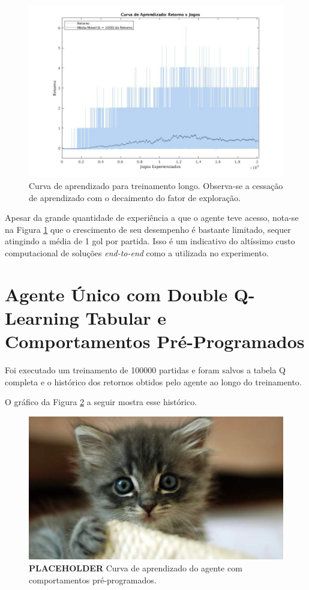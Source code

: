 \begin{figure}[h]
	\includegraphics[width=0.8\linewidth]{figs/curvalonga-qtabular.jpg}
	\centering
	\caption{Curva de aprendizado para treinamento longo. Observa-se a cessação de aprendizado com o decaimento do fator de exploração.}
	\label{fig:single-agent-curvalonga}
\end{figure}

Apesar da grande quantidade de experiência a que o agente teve acesso, nota-se na Figura \ref{fig:single-agent-curvalonga} que o crescimento de seu desempenho é bastante limitado, sequer atingindo a média de 1 gol por partida. Isso é um indicativo do altíssimo custo computacional de soluções \textit{end-to-end} como a utilizada no experimento.

\section{Agente Único com Double Q-Learning Tabular e Comportamentos Pré-Programados}

Foi executado um treinamento de 100000 partidas e foram salvos a tabela Q completa e o histórico dos retornos obtidos pelo agente ao longo do treinamento.

O gráfico da Figura \ref{fig:single-agent-tabular-behaviors} a seguir mostra esse histórico. 

\begin{figure}[h]
	\includegraphics[width=0.8\linewidth]{figs/placekitty16-9.jpg}
	\centering
	\caption{\textbf{PLACEHOLDER} Curva de aprendizado do agente com comportamentos pré-programados.}
	\label{fig:single-agent-tabular-behaviors}
\end{figure}

